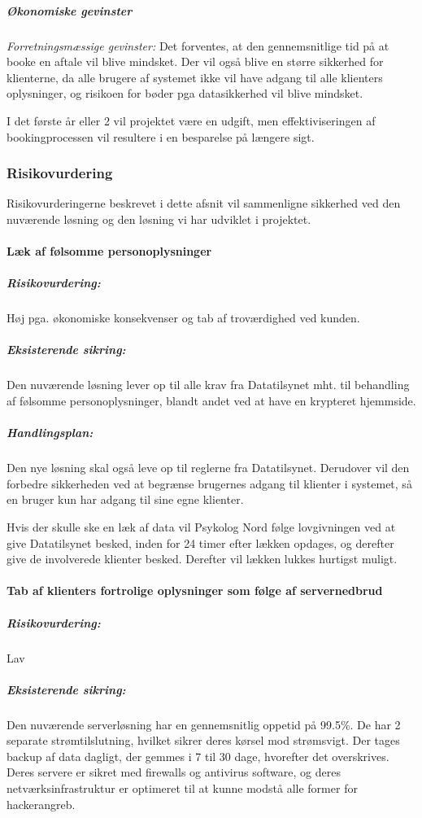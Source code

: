 \subparagraph{Økonomiske gevinster}

\textit{Forretningsmæssige gevinster:} Det forventes, at den gennemsnitlige tid på at booke en aftale vil blive mindsket.
Der vil også blive en større sikkerhed for klienterne, da alle brugere af systemet ikke vil have adgang til alle klienters oplysninger, og risikoen for bøder pga datasikkerhed vil blive mindsket.

I det første år eller 2 vil projektet være en udgift, men effektiviseringen af bookingprocessen vil resultere i en besparelse på længere sigt.

\subsubsection{Risikovurdering}
Risikovurderingerne beskrevet i dette afsnit vil sammenligne sikkerhed ved den nuværende løsning og den løsning vi har udviklet i projektet.

\paragraph*{Læk af følsomme personoplysninger}

\subparagraph{Risikovurdering:}
Høj pga. økonomiske konsekvenser og tab af troværdighed ved kunden.
    
\subparagraph{Eksisterende sikring:}
Den nuværende løsning lever op  til alle krav fra Datatilsynet mht. til behandling af følsomme personoplysninger, blandt andet ved at have en krypteret hjemmside.\cite{terapeutbookingsikkerhed}
    
\subparagraph{Handlingsplan:}
Den nye løsning skal også leve op til reglerne fra Datatilsynet. Derudover vil den forbedre sikkerheden ved at begrænse brugernes adgang til klienter i systemet, så en bruger kun har adgang til sine egne klienter.
    
Hvis der skulle ske en læk af data vil Psykolog Nord følge lovgivningen ved at give Datatilsynet besked, inden for 24 timer efter lækken opdages, og derefter give de involverede klienter besked. Derefter vil lækken lukkes hurtigst muligt.
    
\paragraph*{Tab af klienters fortrolige oplysninger som følge af servernedbrud}

\subparagraph{Risikovurdering:}
Lav
    
\subparagraph{Eksisterende sikring:}
Den nuværende serverløsning har en gennemsnitlig oppetid på 99.5\%. De har 2 separate strømtilslutning, hvilket sikrer deres kørsel mod strømsvigt. Der tages backup af data dagligt, der gemmes i 7 til 30 dage, hvorefter det overskrives. Deres servere er sikret med firewalls og antivirus software, og deres netværksinfrastruktur er optimeret til at kunne modstå alle former for hackerangreb.\cite{terapeutbookingdata}

